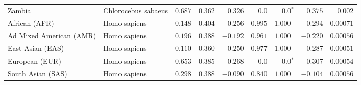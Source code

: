 \begin{center}
\begin{adjustbox}{width = 1\textwidth}
\begin{tabular}{|l|l|r|r|r|r|r|r|r|}
            Zambia        & Chlorocebus sabaeus        & $ 0.687$ & $ 0.362$ & $ 0.326$ & $0.0$ & $\bm{0.0{^*}}$ & $ 0.375$ & $ 0.002$ \\
            African (AFR)               & Homo sapiens        & $ 0.148$ & $ 0.404$ & $-0.256$ & $ 0.995$ & $ 1.000~~$     & $-0.294$ & $0.00071$ \\
            Ad Mixed American (AMR)                 & Homo sapiens        & $ 0.196$ & $ 0.388$ & $-0.192$ & $ 0.961$    & $ 1.000~~$ & $-0.220$ & $0.00056$ \\
            East Asian (EAS)              & Homo sapiens        & $ 0.110$ & $ 0.360$ & $-0.250$ & $ 0.977$ & $ 1.000~~$     & $-0.287$ & $0.00051$ \\
            European (EUR)              & Homo sapiens        & $ 0.653$ & $ 0.385$ & $ 0.268$ & $0.0$ & $\bm{0.0{^*}}$     & $ 0.307$ & $0.00054$ \\
            South Asian (SAS)              & Homo sapiens        & $ 0.298$ & $ 0.388$ & $-0.090$ & $ 0.840$ & $ 1.000~~$     & $-0.104$ & $0.00056$ \\
            \bottomrule
        \end{tabular}
    \end{adjustbox}
\end{center}
